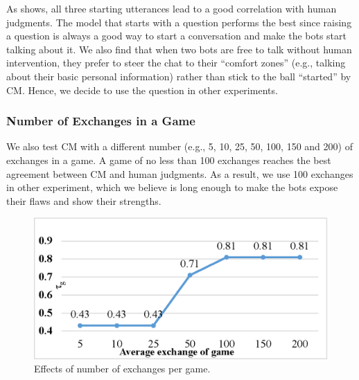As  shows,
 all three starting utterances lead to a 
good correlation with human judgments. 
The model that starts with a question performs the best since 
raising a question is always a good way to start a conversation 
and make the bots start talking about it.
We also find that when two 
bots are free to talk without human intervention, they prefer 
to steer the chat to their ``comfort zones'' (e.g., talking about 
their basic personal information) rather than stick to the ball 
``started'' by CM. 
Hence, we decide to use the question in other experiments.

\subsubsection{Number of Exchanges in a Game} 

We also test CM with a different number (e.g., 5, 10, 25, 50, 100, 150 and 200) of exchanges in a game.
A game of no less than 100 exchanges reaches the best agreement between 
CM and human judgments. As a result, we use 100 exchanges in other experiment, which we believe is long enough to make the bots
 expose their flaws
and show their strengths.
\begin{figure}[th]
\centering
\includegraphics[width=\columnwidth]{number3.eps}
\caption{Effects of number of exchanges per game.}
\label{fig:number}
\end{figure}


